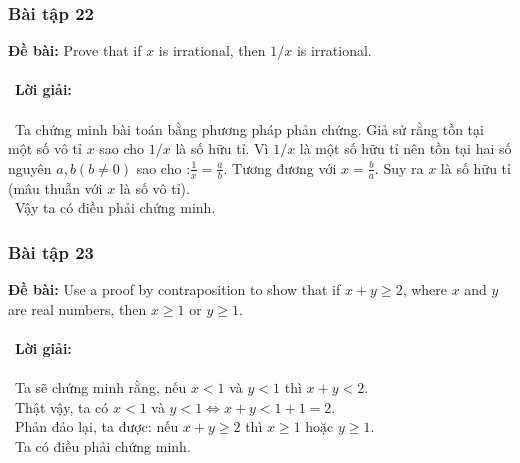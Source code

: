 \documentclass[a4paper]{article}
\begin{document}
\subsubsection{Bài tập 22}
\textbf{Đề bài: }Prove that if $x$ is irrational, then $1/x$ is irrational. \\\ \\\
\textbf{Lời giải:} \\\ \\\
Ta chứng minh bài toán bằng phương pháp phản chứng. Giả sử rằng tồn tại một số vô tỉ $x$ sao cho $1/x$ là số hữu tỉ. Vì $1/x$ là một số hữu tỉ nên tồn tại hai số nguyên $a,b (b \neq 0)$ sao cho :$\frac{1}{x} = \frac{a}{b}.$ Tương đương với $x = \frac{b}{a}$. Suy ra $x$ là số hữu tỉ (mâu thuẫn với $x$ là số vô tỉ). \\\
Vậy ta có điều phải chứng minh.
\clearpage
\subsubsection{Bài tập 23}
\textbf{Đề bài: } Use a proof by contraposition to show that if $x + y \geq 2$, where $x$ and $y$ are real numbers, then $x \geq 1$ or $y \geq 1$.\\\ \\\
\textbf{Lời giải:} \\\ \\\
Ta sẽ chứng minh rằng, nếu $x < 1$ và $y < 1$ thì $x+y< 2$. \\\
Thật vậy, ta có $x < 1$ và $y < 1 \Leftrightarrow x+y < 1+1 = 2$. \\\
Phản đảo lại, ta được: nếu $x+y \geq 2$ thì $x \geq 1$ hoặc $y \geq 1$. \\\
Ta có điều phải chứng minh.

\clearpage
\end{document}
